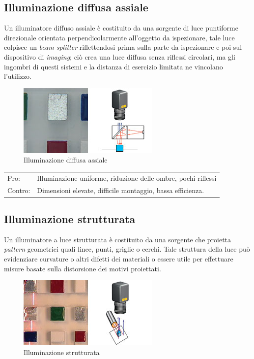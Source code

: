 \subsection{Illuminazione diffusa assiale}
Un illuminatore diffuso assiale  è costituito da una 
sorgente di luce puntiforme direzionale orientata 
perpendicolarmente all'oggetto da ispezionare, tale luce 
colpisce un \emph{beam splitter} riflettendosi prima sulla parte da 
ispezionare e poi sul dispositivo di \emph{imaging}; ciò crea una 
luce diffusa senza riflessi circolari, ma gli  ingombri di 
questi sistemi e la distanza di esercizio limitata ne 
vincolano l'utilizzo. 
\begin{figure}[!h]
\centering
\includegraphics[width=.3\textwidth]{img/illuminazione-diffusa-assiale.jpg}
\caption{Illuminazione diffusa assiale}\label{fig:illuminazione-diffusa-assiale}
\end{figure}



\begin{centering}

\begin{tabular}{l l}
Pro: &  Illuminazione uniforme, riduzione delle ombre, pochi riflessi \\
Contro: &  Dimensioni elevate, difficile montaggio, bassa efficienza.\\
\end{tabular}
\end{centering}


\subsection{Illuminazione strutturata}
Un illuminatore a luce strutturata è costituito da una sorgente che proietta
\emph{pattern} geometrici quali linee, punti, griglie o cerchi. Tale struttura della
luce può evidenziare curvature o altri difetti dei materiali o essere utile 
per effettuare misure basate sulla distorsione dei motivi proiettati.

\begin{figure}[!h]
\centering
\includegraphics[width=.3\textwidth]{img/illuminazione-strutturata.jpg}
\caption{Illuminazione strutturata}\label{fig:illuminazione-strutturata}
\end{figure}



